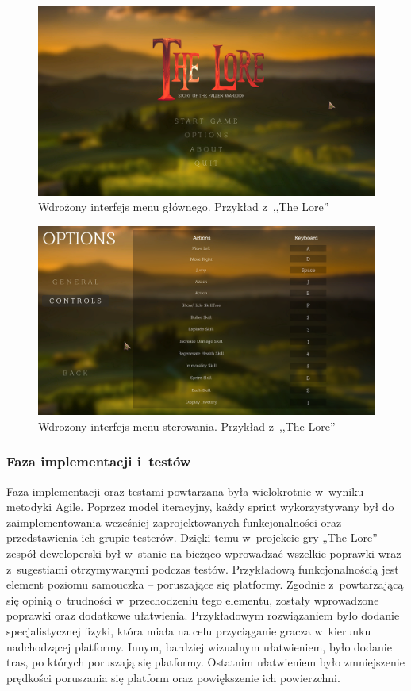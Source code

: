 \documentclass[oneside,polski,logo]{amuthesis}
\begin{document}
\begin{figure}[hb!]
	\centering
	\includegraphics[width=13cm]{images/hyps/of1.png}
	\caption{Wdrożony interfejs menu głównego. Przykład z~,,The Lore''}
\end{figure}
\newpage
\begin{figure}[ht!]
	\centering
	\includegraphics[width=13cm]{images/hyps/of2.png}
	\caption{Wdrożony interfejs menu sterowania. Przykład z~,,The Lore''}
\end{figure}

\subsubsection{Faza implementacji i~testów}

Faza implementacji oraz testami powtarzana była wielokrotnie w~wyniku metodyki Agile. Poprzez model iteracyjny, każdy sprint wykorzystywany był do zaimplementowania wcześniej zaprojektowanych funkcjonalności oraz przedstawienia ich grupie testerów. Dzięki temu w~projekcie gry „The Lore” zespół deweloperski był w~stanie na bieżąco wprowadzać wszelkie poprawki wraz z~sugestiami otrzymywanymi podczas testów. Przykładową funkcjonalnością jest element poziomu samouczka – poruszające się platformy. Zgodnie z~powtarzającą się opinią o~trudności w~przechodzeniu tego elementu, zostały wprowadzone poprawki oraz dodatkowe ułatwienia. Przykładowym rozwiązaniem było dodanie specjalistycznej fizyki, która miała na celu przyciąganie gracza w~kierunku nadchodzącej platformy. Innym, bardziej wizualnym ułatwieniem, było dodanie tras, po których poruszają się platformy. Ostatnim ułatwieniem było zmniejszenie prędkości poruszania się platform oraz powiększenie ich powierzchni.
\end{document}
